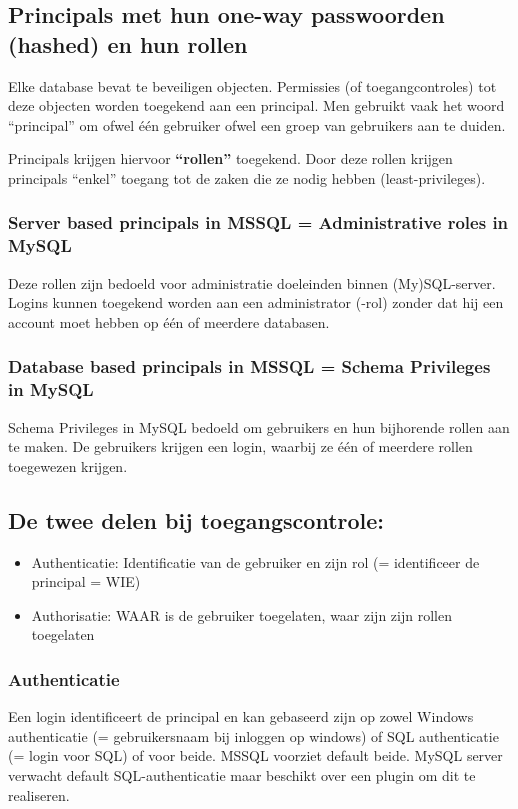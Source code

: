 \documentclass{article}
\newcommand{\bold}[1]{\textbf{#1}}
\begin{document}
\subsection{Principals met hun one-way passwoorden (hashed) en hun rollen}
Elke database bevat te beveiligen objecten. Permissies (of toegangcontroles) tot 
deze objecten worden toegekend aan een principal. Men gebruikt vaak het woord ``principal''
om ofwel één gebruiker ofwel een groep van gebruikers aan te duiden. 

Principals krijgen hiervoor \bold{``rollen''} toegekend. Door deze rollen krijgen principals 
``enkel'' toegang tot de zaken die ze nodig hebben (least-privileges).

\subsubsection{Server based principals in MSSQL = Administrative roles in MySQL}

Deze rollen zijn bedoeld voor administratie doeleinden binnen (My)SQL-server.
Logins kunnen toegekend worden aan een administrator (-rol) zonder dat hij een account moet hebben op één of meerdere databasen.

\subsubsection{Database based principals in MSSQL = Schema Privileges in MySQL}

Schema Privileges in MySQL bedoeld om gebruikers en hun bijhorende rollen aan te maken. 
De gebruikers krijgen een login, waarbij ze één of meerdere rollen toegewezen krijgen.

\subsection{De twee delen bij toegangscontrole:}

\begin{itemize}
    \item Authenticatie: Identificatie van de gebruiker en zijn rol (= identificeer de principal = WIE)
    \item Authorisatie: WAAR is de gebruiker toegelaten, waar zijn zijn rollen toegelaten
\end{itemize}

\subsubsection{Authenticatie}
Een login identificeert de principal en kan gebaseerd zijn op zowel Windows authenticatie (= gebruikersnaam bij
inloggen op windows) of SQL authenticatie (= login voor SQL) of voor beide. MSSQL voorziet default beide. MySQL
server verwacht default SQL-authenticatie maar beschikt over een plugin om dit te realiseren.
\end{document}
